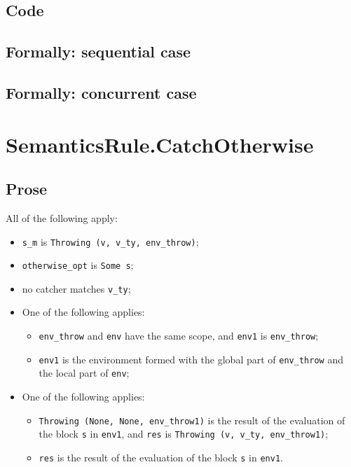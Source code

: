 \documentclass{book}
\begin{document}
  \subsection{Code}

\begin{emptyformal}
  \subsection{Formally: sequential case}

  \subsection{Formally: concurrent case}
\end{emptyformal}


\section{SemanticsRule.CatchOtherwise \label{sec:SemanticsRule.CatchOtherwise}}

    \subsection{Prose}
    All of the following apply:
    \begin{itemize}
    \item \texttt{s\_m} is \texttt{Throwing (v, v\_ty, env\_throw)};
    \item \texttt{otherwise\_opt} is \texttt{Some s};
    \item no catcher matches \texttt{v\_ty};
    \item One of the following applies:
      \begin{itemize}
      \item \texttt{env\_throw} and \texttt{env} have the same scope, and \texttt{env1} is \texttt{env\_throw};
      \item \texttt{env1} is the environment formed with the global part of \texttt{env\_throw}
        and the local part of \texttt{env};
      \end{itemize}
    \item One of the following applies:
      \begin{itemize}
      \item \texttt{Throwing (None, None, env\_throw1)} is the result of the evaluation of
        the block \texttt{s} in \texttt{env1}, and \texttt{res} is \texttt{Throwing (v, v\_ty, env\_throw1)};
      \item \texttt{res} is the result of the evaluation of the block \texttt{s} in \texttt{env1}.
      \end{itemize}
    \end{itemize}
\end{document}
